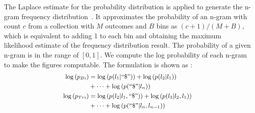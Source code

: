 The Laplace estimate for the probability distribution is applied to generate the n-gram frequency distribution~\cite{field1988laplacian}. 
It approximates the probability of an n-gram with count $c$ from a collection with $M$ outcomes and $B$ bins as $(c+1)/(M+B)$, which is equivalent to adding 1 to each bin and obtaining the maximum likelihood estimate of the frequency distribution result.
The probability of a given n-gram is in the range of $[0, 1]$.
	We compute the log probability of each n-gram to make the figures computable.
	The formulation is shown as :
\begin{equation}
\small
\label{equ:bi&tri} 
\begin{split}
\log\left(p_{Bi}\right)&=\log\left(p(l_1|``\$")\right)+\log\left(p(l_2|l_1)\right)\\
&+\dots+
\log\left(p(``\$"|l_n)\right)\\
\log\left(p_{Tri}\right)&=\log\left(p(l_2|l_1,``\$")\right)+\log\left(p(l_3|l_2,l_1)\right)\\
&+\dots+\log\left(p(``\$"|l_n,l_{n-1})\right)
\end{split}
\end{equation}

